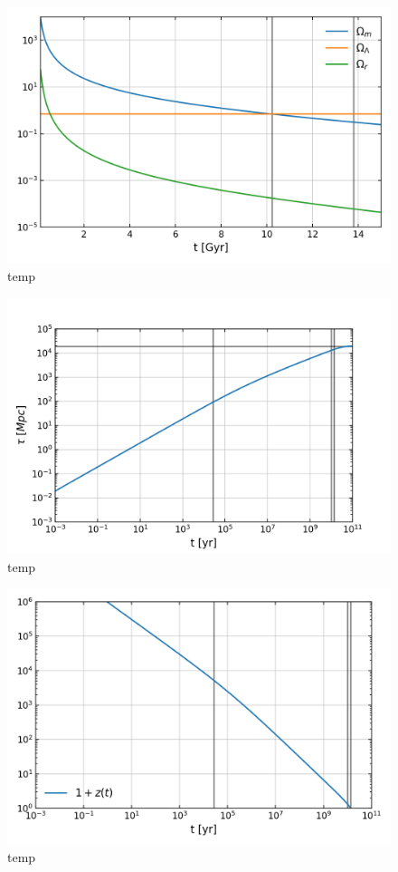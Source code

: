 \begin{figure}[!pth]
\centering     %
    \includegraphics[width=.75\columnwidth]{plots/lcdm_components_linear.png}
\caption{
    temp
}\label{fig:lcdm_components_linear}
\end{figure}
\begin{figure}[!pth]
\centering     %
    \includegraphics[width=.75\columnwidth]{plots/lcdm_tau.png}
\caption{
    temp
}\label{fig:lcdm_tau}
\end{figure}
\begin{figure}[!pth]
\centering     %
    \includegraphics[width=.75\columnwidth]{plots/lcdm_z.png}
\caption{
    temp
}\label{fig:lcdm_z}
\end{figure}

